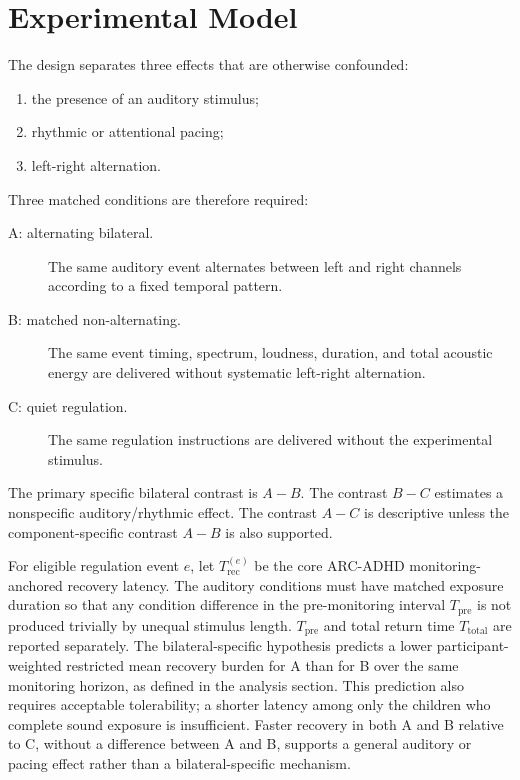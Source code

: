 \section{Experimental Model}

The design separates three effects that are otherwise confounded:

\begin{enumerate}
\item the presence of an auditory stimulus;
\item rhythmic or attentional pacing;
\item left-right alternation.
\end{enumerate}

Three matched conditions are therefore required:

\begin{description}
\item[A: alternating bilateral.] The same auditory event alternates between left and right channels according to a fixed temporal pattern.
\item[B: matched non-alternating.] The same event timing, spectrum, loudness, duration, and total acoustic energy are delivered without systematic left-right alternation.
\item[C: quiet regulation.] The same regulation instructions are delivered without the experimental stimulus.
\end{description}

The primary specific bilateral contrast is \(A-B\). The contrast \(B-C\) estimates a nonspecific auditory/rhythmic effect. The contrast \(A-C\) is descriptive unless the component-specific contrast \(A-B\) is also supported.

For eligible regulation event \(e\), let \(T_{\mathrm{rec}}^{(e)}\) be the core ARC-ADHD monitoring-anchored recovery latency. The auditory conditions must have matched exposure duration so that any condition difference in the pre-monitoring interval \(T_{\mathrm{pre}}\) is not produced trivially by unequal stimulus length. \(T_{\mathrm{pre}}\) and total return time \(T_{\mathrm{total}}\) are reported separately. The bilateral-specific hypothesis predicts a lower participant-weighted restricted mean recovery burden for A than for B over the same monitoring horizon, as defined in the analysis section. This prediction also requires acceptable tolerability; a shorter latency among only the children who complete sound exposure is insufficient. Faster recovery in both A and B relative to C, without a difference between A and B, supports a general auditory or pacing effect rather than a bilateral-specific mechanism.
